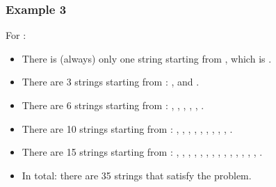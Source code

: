 \documentclass[letterpaper,12pt,english]{book}
\begin{document}
\subsubsection{Example 3}
\label{\detokenize{Mathematics/09_MTH_1641_Count_Sorted_Vowel_Strings:id1}}
\sphinxAtStartPar
For :
\begin{itemize}
\item {} 
\sphinxAtStartPar
There is (always) only one string starting from , which is .

\item {} 
\sphinxAtStartPar
There are 3 strings starting from : ,  and .

\item {} 
\sphinxAtStartPar
There are 6 strings starting from : , , , , , .

\item {} 
\sphinxAtStartPar
There are 10 strings starting from : , , , , , , , , , .

\item {} 
\sphinxAtStartPar
There are 15 strings starting from : , , , , , , , , , , , , , , .

\item {} 
\sphinxAtStartPar
In total: there are 35 strings that satisfy the problem.

\end{itemize}
\end{document}

